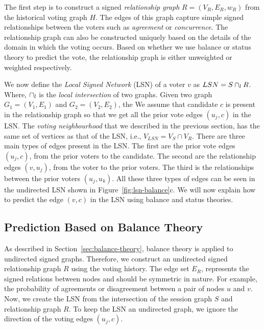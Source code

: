 The first step is to construct a signed \textit{relationship graph} $R=(V_R,E_R,w_R)$ from the historical voting graph $H$.
The edges of this graph capture simple signed relationships between the voters such as \textit{agreement} or \textit{concurrence}.
The relationship graph can also be constructed uniquely based on the details of the domain in which the voting occurs.
Based on whether we use balance or status theory to predict the vote, the relationship graph is either unweighted or weighted respectively.

We now define the \textit{Local Signed Network} (LSN) of a voter $v$ as $LSN = S \cap_{l} R$.
Where, $\cap_{l}$ is the \textit{local intersection} of two graphs.
Given two graph $G_1=(V_1,E_1)$ and $G_2=(V_2,E_2)$, the 
We assume that candidate $c$ is present in the relationship graph so that we get all the prior vote edges $(u_j,c)$ in the LSN.
The \textit{voting neighbourhood} that we described in the previous section, has the same set of vertices as that of the LSN, i.e., $V_{LSN}=V_S \cap V_R$.
There are three main types of edges present in the LSN.
The first are the prior vote edges $(u_j,c)$, from the prior voters to the candidate.
The second are the relationship edges $(v,u_j)$, from the voter to the prior voters.
The third is the relationships between the prior voters $(u_j,u_k)$.
All these three types of edges can be seen in the undirected LSN shown in Figure~\ref{fig:lsn-balance}c.
We will now explain how to predict the edge $(v,c)$ in the LSN using balance and status theories.  

\subsection{Prediction Based on Balance Theory}
\label{subsec:prediction-based-balance}
As described in Section~\ref{sec:balance-theory}, balance theory is applied to undirected signed graphs.
Therefore, we construct an undirected signed relationship graph $R$ using the voting history.
The edge set $E_{R}$, represents the signed relations between nodes and should be symmetric in nature.
For example, the probability of agreements or disagreement between a pair of nodes $u$ and $v$.
Now, we create the LSN from the intersection of the session graph $S$ and relationship graph $R$.
To keep the LSN an undirected graph, we ignore the direction of the voting edges $(u_j,c)$. 

